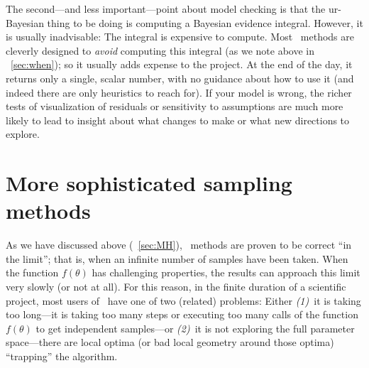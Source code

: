 \documentclass[modern]{aastex61}
\newcommand{\MCMC}{\acronym{MCMC}}
\newcommand{\pars}{\theta}
\begin{document}
The second---and less important---point about model checking is that
the ur-Bayesian thing to be doing is computing a Bayesian evidence
integral.
However, it is usually inadvisable:
The integral is expensive to compute.
Most \MCMC\ methods are cleverly designed to \emph{avoid} computing this
integral (as we note above in \sectionname~\ref{sec:when}); so it usually adds
expense to the project.
At the end of the day, it returns only a single, scalar number, with
no guidance about how to use it (and indeed there are only heuristics
to reach for).
If your model is wrong, the richer tests of visualization of residuals
or sensitivity to assumptions are much more likely to lead to insight
about what changes to make or what new directions to explore.

\section{More sophisticated sampling methods}\label{sec:methods}
\nopagebreak
As we have discussed above (\sectionname~\ref{sec:MH}),
\MCMC\ methods are proven to be correct ``in the limit''; that is, when
an infinite number of samples have been taken.
When the function $f(\pars)$ has challenging properties, the results
can approach this limit very slowly (or not at all).
For this reason, in the finite duration of a scientific project, most
users of \MCMC\ have one of two (related) problems:
Either \textsl{(1)}~it is taking too long---it is taking too many steps or
executing too many calls of the function $f(\pars)$ to get independent
samples---or \textsl{(2)}~it is not
exploring the full parameter space---there are local optima (or bad
local geometry around those optima) ``trapping'' the algorithm.
\end{document}
